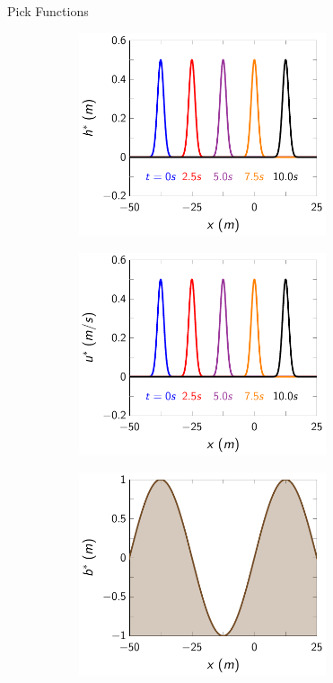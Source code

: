 \documentclass[]{beamer}
\begin{document}
\begin{frame}{Pick Functions}

\begin{figure}
	\centering
	\begin{subfigure}{0.5\textwidth}
		\includegraphics[width=0.8\textwidth]{./Pics/DryBed/Forced/h.pdf}
	\end{subfigure}%
	\begin{subfigure}{0.5\textwidth}
		\includegraphics[width=0.8\textwidth]{./Pics/DryBed/Forced/u.pdf}
	\end{subfigure}
	\begin{subfigure}{0.5\textwidth}
		\includegraphics[width=0.8\textwidth]{./Pics/DryBed/Forced/b.pdf}

\end{subfigure}
\end{figure}
\end{frame}
\end{document}
